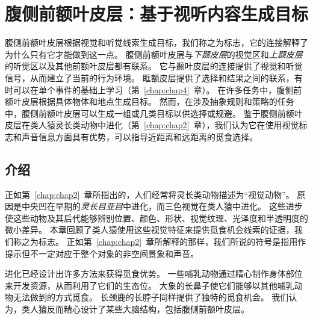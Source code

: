 \chapter{腹侧前额叶皮层：基于视听内容生成目标} \label{chap:chap7}


腹侧前额叶皮层根据视觉和听觉线索生成目标，我们称之为标志，它的连接解释了为什么只有它才能做到这一点。
腹侧前额叶皮层与\textit{下颞皮层}的视觉区和\textit{上颞皮层}的听觉区以及其他前额叶皮层都有联系。
它与颞叶皮层的连接提供了视觉和听觉信号，从而建立了当前的行为环境。
眶额皮层提供了选择和结果之间的联系，有时可以在单个事件的基础上学习（第~\ref{chap:chap4}~章）。
在许多任务中，腹侧前额叶皮层根据具体物体和地点生成目标。
然而，在涉及抽象规则和策略的任务中，腹侧前额叶皮层可以生成一组或几类目标以供选择或规避。
鉴于腹侧前额叶皮层在类人猿灵长类动物中进化（第~\ref{chap:chap2}~章），我们认为它在使用视觉标志和声音信息方面具有优势，可以指导近距离和远距离的觅食选择。


\section{介绍}
\par

正如第~\ref{chap:chap2}~章所指出的，人们经常将灵长类动物描述为“视觉动物”。
原因是中央凹在早期的\textit{灵长目亚目}中进化，而三色视觉在类人猿中进化。
这些进步使这些动物及其后代能够辨别位置、颜色、形状、视觉纹理、光泽度和半透明度的微小差异。
本章回顾了类人猿使用这些视觉特征来提供觅食机会线索的证据，我们称之为标志。
正如第~\ref{chap:chap2}~章所解释的那样，我们所说的符号是指用作提示但不一定对应于整个对象的非空间景象和声音。
\par
进化已经设计出许多方法来获得觅食优势。
一些哺乳动物通过精心制作身体部位来开发资源，从而利用了它们的生态位。
大象的长鼻子使它们能够以其他哺乳动物无法做到的方式觅食。
长颈鹿的长脖子同样提供了独特的觅食机会。
我们认为，类人猿反而精心设计了某些大脑结构，包括腹侧前额叶皮层。

